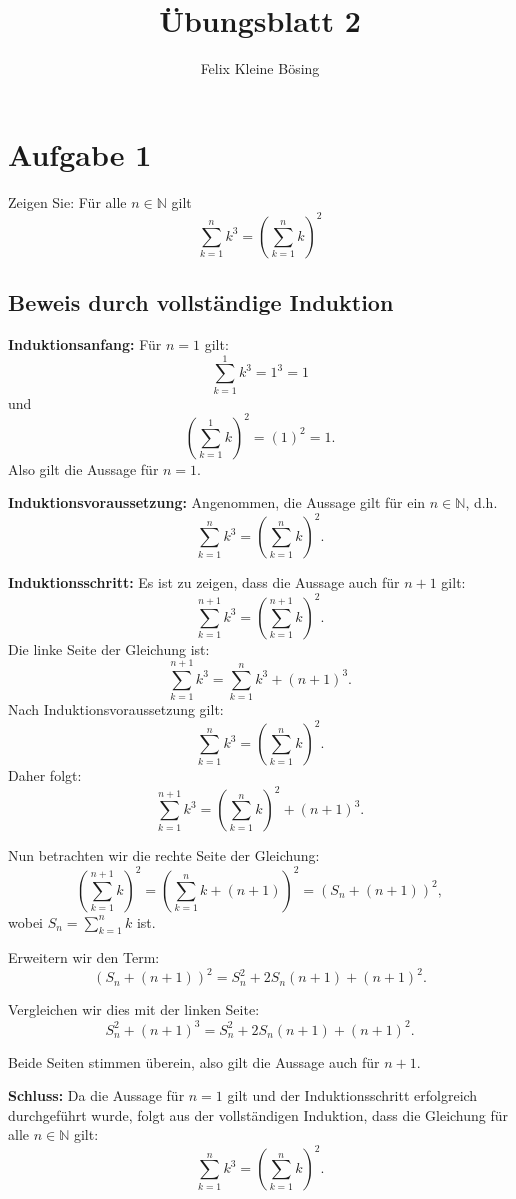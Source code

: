 \documentclass[11pt]{article}
\begin{document}
\title{Übungsblatt 2}
\author{Felix Kleine Bösing}
\maketitle

\section*{Aufgabe 1}

Zeigen Sie: Für alle \( n \in \mathbb{N} \) gilt
\[
\sum_{k=1}^{n} k^3 = \left( \sum_{k=1}^{n} k \right)^2
\]

\subsection*{Beweis durch vollständige Induktion}

\textbf{Induktionsanfang:} Für \( n = 1 \) gilt:
\[
\sum_{k=1}^{1} k^3 = 1^3 = 1
\]
und
\[
\left( \sum_{k=1}^{1} k \right)^2 = (1)^2 = 1.
\]
Also gilt die Aussage für \( n = 1 \).

\textbf{Induktionsvoraussetzung:}
Angenommen, die Aussage gilt für ein \( n \in \mathbb{N} \), d.h.
\[
\sum_{k=1}^{n} k^3 = \left( \sum_{k=1}^{n} k \right)^2.
\]

\textbf{Induktionsschritt:}
Es ist zu zeigen, dass die Aussage auch für \( n + 1 \) gilt:
\[
\sum_{k=1}^{n+1} k^3 = \left( \sum_{k=1}^{n+1} k \right)^2.
\]
Die linke Seite der Gleichung ist:
\[
\sum_{k=1}^{n+1} k^3 = \sum_{k=1}^{n} k^3 + (n+1)^3.
\]
Nach Induktionsvoraussetzung gilt:
\[
\sum_{k=1}^{n} k^3 = \left( \sum_{k=1}^{n} k \right)^2.
\]
Daher folgt:
\[
\sum_{k=1}^{n+1} k^3 = \left( \sum_{k=1}^{n} k \right)^2 + (n+1)^3.
\]

Nun betrachten wir die rechte Seite der Gleichung:
\[
\left( \sum_{k=1}^{n+1} k \right)^2 = \left( \sum_{k=1}^{n} k + (n+1) \right)^2 = \left( S_n + (n+1) \right)^2,
\]
wobei \( S_n = \sum_{k=1}^{n} k \) ist.

Erweitern wir den Term:
\[
\left( S_n + (n+1) \right)^2 = S_n^2 + 2S_n(n+1) + (n+1)^2.
\]

Vergleichen wir dies mit der linken Seite:
\[
S_n^2 + (n+1)^3 = S_n^2 + 2S_n(n+1) + (n+1)^2.
\]

Beide Seiten stimmen überein, also gilt die Aussage auch für \( n + 1 \).

\textbf{Schluss:}
Da die Aussage für \( n = 1 \) gilt und der Induktionsschritt erfolgreich durchgeführt wurde, folgt aus der vollständigen Induktion, dass die Gleichung für alle \( n \in \mathbb{N} \) gilt:
\[
\sum_{k=1}^{n} k^3 = \left( \sum_{k=1}^{n} k \right)^2.
\]
\end{document}
